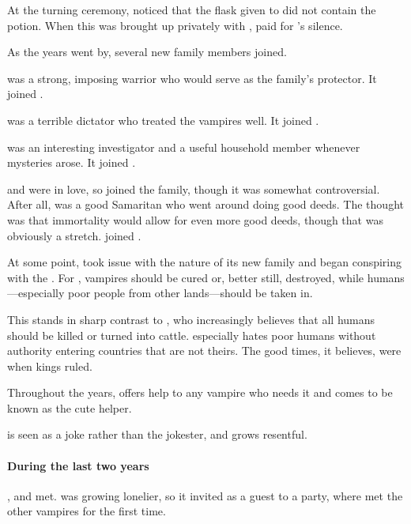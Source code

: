 At the turning ceremony,  noticed that the flask given to  did not contain the potion. When this was brought up privately with ,  paid for 's silence.

As the years went by, several new family members joined.

 was a strong, imposing warrior who would serve as the family's protector. It joined .

 was a terrible dictator who treated the vampires well. It joined .

 was an interesting investigator and a useful household member whenever mysteries arose. It joined .

 and  were in love, so  joined the family, though it was somewhat controversial. After all,  was a good Samaritan who went around doing good deeds. The thought was that immortality would allow for even more good deeds, though that was obviously a stretch.  joined .

At some point,  took issue with the nature of its new family and began conspiring with the . For , vampires should be cured or, better still, destroyed, while humans---especially poor people from other lands---should be taken in.

This stands in sharp contrast to , who increasingly believes that all humans should be killed or turned into cattle.  especially hates poor humans without authority entering countries that are not theirs. The good times, it believes, were when kings ruled.

Throughout the years,  offers help to any vampire who needs it and comes to be known as the cute helper.

 is seen as a joke rather than the jokester, and grows resentful.

\paragraph{During the last two years}

,  and  met.  was growing lonelier, so it invited  as a guest to a party, where  met the other vampires for the first time.

